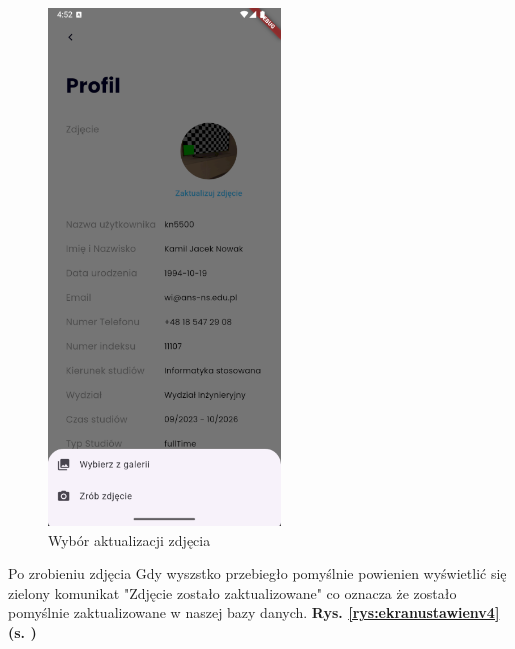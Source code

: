 \begin{figure}[h!]
	\centering
	\includegraphics[width=0.55\textwidth]{rys/ekranustawienv3.png}
	\caption{Wybór aktualizacji zdjęcia}
	\label{rys:ekranustawienv3}
\end{figure}
\newpage
Po zrobieniu zdjęcia Gdy wyszstko przebiegło pomyślnie powienien wyświetlić się zielony komunikat "Zdjęcie zostało zaktualizowane" co oznacza że zostało pomyślnie zaktualizowane w naszej bazy danych.  \textbf{Rys. \ref{rys:ekranustawienv4} (s. \pageref{rys:ekranustawienv4})}
